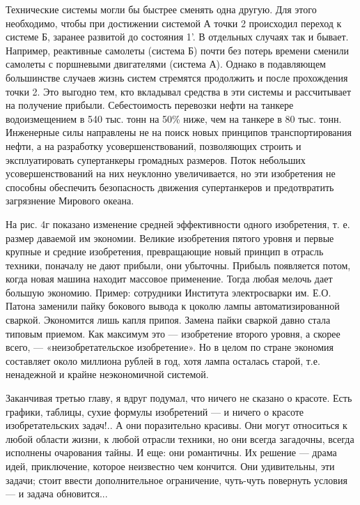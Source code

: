 Технические системы  могли бы быстрее  сменять одна другую.  Для этого
необходимо,  чтобы  при  достижении  системой  А  точки  2  происходил
переход к  системе Б,  заранее развитой до  состояния 1'.  В отдельных
случаях  так  и  бывает.  Например, реактивные  самолеты  (система  Б)
почти  без потерь  времени сменили  самолеты с  поршневыми двигателями
(система  А). Однако  в подавляющем  большинстве случаев  жизнь систем
стремятся продолжить и после прохождения точки 2. Это выгодно тем, кто
вкладывал средства в эти системы  и рассчитывает на получение прибыли.
Себестоимость  перевозки нефти  на танкере  водоизмещением в  540 тыс.
тонн  на 50\%  ниже, чем  на танкере  в 80  тыс. тонн.  Инженерные силы
направлены не на  поиск новых принципов транспортирования  нефти, а на
разработку усовершенствований,  позволяющих строить  и эксплуатировать
супертанкеры громадных размеров. Поток небольших усовершенствований на
них неуклонно увеличивается, но эти изобретения не способны обеспечить
безопасность  движения   супертанкеров  и   предотвратить  загрязнение
Мирового океана.

На   рис.  4г   показано   изменение   средней  эффективности   одного
изобретения, т.  е. размер  даваемой им экономии.  Великие изобретения
пятого  уровня и  первые крупные  и средние  изобретения, превращающие
новый  принцип  в  отрасль  техники, поначалу  не  дают  прибыли,  они
убыточны.  Прибыль  появляется  потом,   когда  новая  машина  находит
массовое применение. Тогда любая мелочь дает большую экономию. Пример:
сотрудники  Института электросварки  им.  Е.О.  Патона заменили  пайку
бокового вывода к цоколю  лампы автоматизированной сваркой. Экономится
лишь капля припоя.  Замена пайки сваркой давно  стала типовым приемом.
Как  максимум это  — изобретение  второго  уровня, а  скорее всего,  —
«неизобретательское  изобретение».  Но  в  целом  по  стране  экономия
составляет около  миллиона рублей в  год, хотя лампа  осталась старой,
т.е. ненадежной и крайне неэкономичной системой.

Заканчивая  третью главу,  я вдруг  подумал, что  ничего не  сказано о
красоте. Есть графики, таблицы, сухие формулы изобретений — и ничего о
красоте  изобретательских задач!..  А  они  поразительно красивы.  Они
могут относиться  к любой области  жизни, к любой отрасли  техники, но
они всегда  загадочны, всегда исполнены  очарования тайны. И  еще: они
романтичны. Их  решение — драма идей,  приключение, которое неизвестно
чем кончится. Они удивительны, эти задачи; стоит ввести дополнительное
ограничение, чуть-чуть повернуть условия — и задача обновится...

